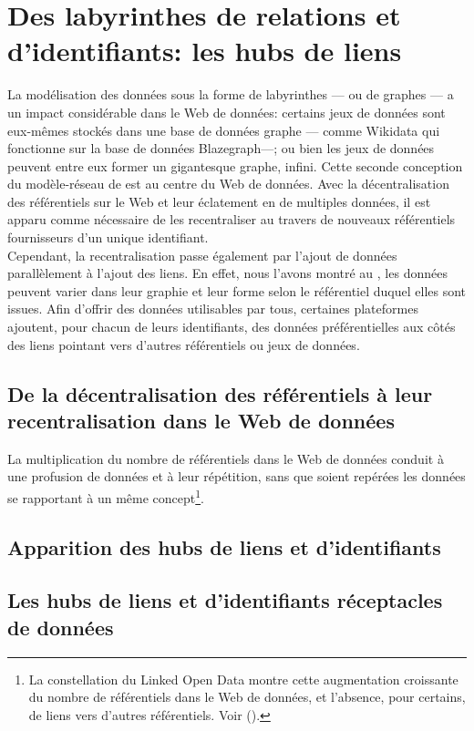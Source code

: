 \section{\label{III-A-2}Des labyrinthes de relations et d'identifiants: les hubs de liens}

La modélisation des données sous la forme de labyrinthes --- ou de graphes --- a un impact  considérable dans le Web de données: certains jeux de données sont eux-mêmes stockés dans une base de données graphe --- comme Wikidata qui fonctionne sur la base de données Blazegraph---; ou bien les jeux de données peuvent entre eux former un gigantesque graphe, infini. Cette seconde conception du modèle-réseau de  est au centre du Web de données. Avec la décentralisation des référentiels sur le Web et leur éclatement en de multiples données, il est apparu comme nécessaire de les recentraliser au travers de nouveaux référentiels fournisseurs d'un unique identifiant.\\

Cependant, la recentralisation passe également par l'ajout de données parallèlement à l'ajout des liens. En effet, nous l'avons montré au , les données peuvent varier dans leur graphie et leur forme selon le référentiel duquel elles sont issues. Afin d'offrir des données utilisables par tous, certaines plateformes ajoutent, pour chacun de leurs identifiants, des données préférentielles aux côtés des liens pointant vers d'autres référentiels ou jeux de données.

\subsection{\label{III-A-2-a}De la décentralisation des référentiels à leur recentralisation dans le Web de données}

La multiplication du nombre de référentiels dans le Web de données conduit à une profusion de données et à leur répétition, sans que soient repérées les données se rapportant à un même concept\footnote{La constellation du Linked Open Data montre cette augmentation croissante du nombre de référentiels dans le Web de données, et l'absence, pour certains, de liens vers d'autres référentiels. Voir  ().}. 

\subsection{\label{III-A-2-b}Apparition des hubs de liens et d'identifiants}

\subsection{\label{III-A-2-c}Les hubs de liens et d'identifiants réceptacles de données}

